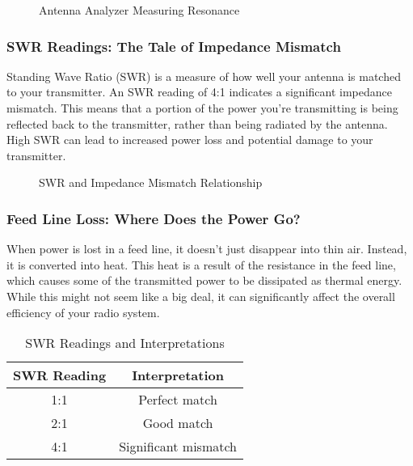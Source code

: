 \begin{figure}[h]
    \centering
    \caption{Antenna Analyzer Measuring Resonance}
    \label{fig:antenna-analyzer}
\end{figure}

\subsubsection*{SWR Readings: The Tale of Impedance Mismatch}

Standing Wave Ratio (SWR) is a measure of how well your antenna is matched to your transmitter. An SWR reading of 4:1 indicates a significant impedance mismatch. This means that a portion of the power you're transmitting is being reflected back to the transmitter, rather than being radiated by the antenna. High SWR can lead to increased power loss and potential damage to your transmitter.

\begin{figure}[h]
    \centering
    \caption{SWR and Impedance Mismatch Relationship}
    \label{fig:swr-graph}
\end{figure}

\subsubsection*{Feed Line Loss: Where Does the Power Go?}

When power is lost in a feed line, it doesn't just disappear into thin air. Instead, it is converted into heat. This heat is a result of the resistance in the feed line, which causes some of the transmitted power to be dissipated as thermal energy. While this might not seem like a big deal, it can significantly affect the overall efficiency of your radio system.

\begin{table}[h]
    \centering
    \caption{SWR Readings and Interpretations}
    \label{tab:swr-readings}
    \begin{tabular}{|c|c|}
        \hline
        \textbf{SWR Reading} & \textbf{Interpretation} \\
        \hline
        1:1 & Perfect match \\
        2:1 & Good match \\
        4:1 & Significant mismatch \\
        \hline
    \end{tabular}
\end{table}

